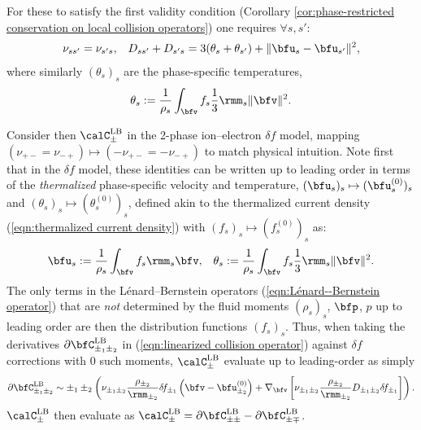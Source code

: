    For these to satisfy the first validity condition (Corollary \ref{cor:phase-restricted conservation on local collision operators}) one requires $\forall s, s'$:
    \begin{align}
        \nu_{ss'}          =  \nu_{s's},  &&
        D_{ss'} + D_{s's}  =  3(\theta_{s} + \theta_{s'}) + \|\bfu_{s} - \bfu_{s'}\|^{2},
    \end{align}
    where similarly $(\theta_{s})_{s}$ are the phase-specific temperatures,
    \begin{equation}
        \theta_{s}  :=  \frac{1}{\rho_{s}}\int_{\bfv}f_{s}\frac{1}{3}\rmm_{s}\|\bfv\|^{2}.
    \end{equation}
    
    Consider then $\calC_{\pm}^{\rm LB}$ in the 2-phase ion--electron $\delta\!f$ model, mapping $(\nu_{+-} = \nu_{-+})  \mapsto  (- \nu_{+-} = - \nu_{-+})$ to match physical intuition. Note first that in the $\delta\!f$ model, these identities can be written up to leading order in terms of the \emph{thermalized} phase-specific velocity and temperature, $(\bfu_{s})_{s}  \mapsto  (\bfu_{s}^{(0)})_{s}$ and $(\theta_{s})_{s}  \mapsto  (\theta_{s}^{(0)})_{s}$, defined akin to the thermalized current density (\ref{eqn:thermalized current density}) with $(f_{s})_{s}  \mapsto  (f_{s}^{(0)})_{s}$ as:
    \begin{align}
        \bfu_{s}    :=  \frac{1}{\rho_{s}}\int_{\bfv}f_{s}\rmm_{s}\bfv,  &&
        \theta_{s}  :=  \frac{1}{\rho_{s}}\int_{\bfv}f_{s}\frac{1}{3}\rmm_{s}\|\bfv\|^{2}.
    \end{align}
    The only terms in the Lénard--Bernstein operators (\ref{eqn:Lénard--Bernstein operator}) that are \emph{not} determined by the fluid moments $(\rho_{s})_{s}$, $\bfp$, $p$ up to leading order are then the distribution functions $(f_{s})_{s}$. Thus, when taking the derivatives $\partial\bfC_{\pm_{1}\pm_{2}}^{\rm LB}$ in (\ref{eqn:linearized collision operator}) against $\delta\!f$ corrections with 0 such moments, $\calC_{\pm}^{\rm LB}$ evaluate up to leading-order as simply
    \begin{equation}
        \partial\bfC_{\pm_{1}\pm_{2}}^{\rm LB}  \sim  \pm_{1}\pm_{2}\left(\nu_{\pm_{1}\pm_{2}}\frac{\rho_{\pm_{2}}}{\rmm_{\pm_{2}}}\delta\!f_{\pm_{1}}\left(\bfv - \bfu_{\pm_{2}}^{(0)}\right) + \nabla_{\bfv}\left[\nu_{\pm_{1}\pm_{2}}\frac{\rho_{\pm_{2}}}{\rmm_{\pm_{2}}}D_{\pm_{1}\pm_{2}}\delta\!f_{\pm_{1}}\right]\right).
    \end{equation}
    $\calC_{\pm}^{\rm LB}$ then evaluate as $\calC_{\pm}^{\rm LB}  =  \partial\bfC_{\pm\pm}^{\rm LB} - \partial\bfC_{\pm\mp}^{\rm LB}$.
    
